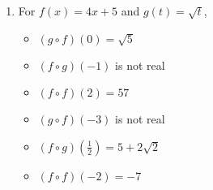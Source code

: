 \documentclass{ximera}
\begin{document}
\begin{enumerate}
\begin{multicols}{3}
\begin{itemize}
\item  $(f \circ f)(2) = 0$

\end{itemize}

\end{multicols}

\begin{multicols}{3}

\begin{itemize}

\item  $(g\circ f)(-3) = 11$

\item  $(f\circ g)\left(\frac{1}{2}\right) = \frac{23}{4}$

\item  $(f \circ f)(-2) = 2$

\end{itemize}

\end{multicols}

\item  For $f(x) = 4x+5$ and $g(t) = \sqrt{t}$,
\begin{multicols}{3}

\begin{itemize}

\item  $(g\circ f)(0) = \sqrt{5}$

\item  $(f\circ g)(-1)$ is not real

\item  $(f \circ f)(2) = 57$

\end{itemize}

\end{multicols}

\begin{multicols}{3}

\begin{itemize}

\item  $(g\circ f)(-3)$ is not real

\item  $(f\circ g)\left(\frac{1}{2}\right) = 5+2\sqrt{2}$

\item  $(f \circ f)(-2) = -7$

\end{itemize}

\end{multicols}


\end{enumerate}
\end{document}
